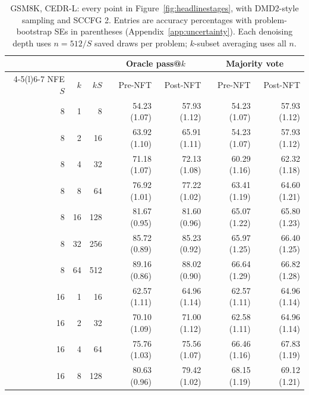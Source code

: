 \documentclass[11pt,letterpaper]{article}
\begin{document}
\begin{table}[!htbp]
\caption{GSM8K, CEDR-L: every point in Figure~\ref{fig:headlinestages}, with DMD2-style sampling and SCCFG 2. Entries are accuracy percentages with problem-bootstrap SEs in parentheses (Appendix~\ref{app:uncertainty}). Each denoising depth uses $n=512/S$ saved draws per problem; $k$-subset averaging uses all $n$.}
\label{tab:budgetvaluesgsml}
\centering\small
\setlength{\tabcolsep}{5pt}
\begin{tabular}{@{}rrr rrrr@{}}
\toprule
& & & \multicolumn{2}{c}{Oracle pass@$k$} & \multicolumn{2}{c}{Majority vote} \\
\cmidrule(lr){4-5}\cmidrule(l){6-7}
NFE $S$ & $k$ & $kS$ & Pre-NFT & Post-NFT & Pre-NFT & Post-NFT \\
\midrule
8 & 1 & 8 & 54.23 {\scriptsize (1.07)} & 57.93 {\scriptsize (1.12)} & 54.23 {\scriptsize (1.07)} & 57.93 {\scriptsize (1.12)} \\
8 & 2 & 16 & 63.92 {\scriptsize (1.10)} & 65.91 {\scriptsize (1.11)} & 54.23 {\scriptsize (1.07)} & 57.93 {\scriptsize (1.12)} \\
8 & 4 & 32 & 71.18 {\scriptsize (1.07)} & 72.13 {\scriptsize (1.08)} & 60.29 {\scriptsize (1.16)} & 62.32 {\scriptsize (1.18)} \\
8 & 8 & 64 & 76.92 {\scriptsize (1.01)} & 77.22 {\scriptsize (1.02)} & 63.41 {\scriptsize (1.19)} & 64.60 {\scriptsize (1.21)} \\
8 & 16 & 128 & 81.67 {\scriptsize (0.95)} & 81.60 {\scriptsize (0.96)} & 65.07 {\scriptsize (1.22)} & 65.80 {\scriptsize (1.23)} \\
8 & 32 & 256 & 85.72 {\scriptsize (0.89)} & 85.23 {\scriptsize (0.92)} & 65.97 {\scriptsize (1.25)} & 66.40 {\scriptsize (1.25)} \\
8 & 64 & 512 & 89.16 {\scriptsize (0.86)} & 88.02 {\scriptsize (0.90)} & 66.64 {\scriptsize (1.29)} & 66.82 {\scriptsize (1.28)} \\
\midrule
16 & 1 & 16 & 62.57 {\scriptsize (1.11)} & 64.96 {\scriptsize (1.14)} & 62.57 {\scriptsize (1.11)} & 64.96 {\scriptsize (1.14)} \\
16 & 2 & 32 & 70.10 {\scriptsize (1.09)} & 71.00 {\scriptsize (1.12)} & 62.58 {\scriptsize (1.11)} & 64.96 {\scriptsize (1.14)} \\
16 & 4 & 64 & 75.76 {\scriptsize (1.03)} & 75.56 {\scriptsize (1.07)} & 66.46 {\scriptsize (1.16)} & 67.83 {\scriptsize (1.19)} \\
16 & 8 & 128 & 80.63 {\scriptsize (0.96)} & 79.42 {\scriptsize (1.02)} & 68.15 {\scriptsize (1.19)} & 69.12 {\scriptsize (1.21)} \\

\end{tabular}
\end{table}
\end{document}
